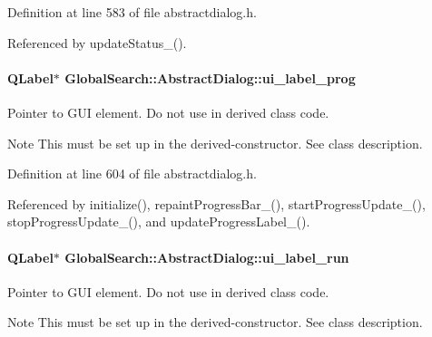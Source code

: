 Definition at line 583 of file abstractdialog.\+h.



Referenced by update\+Status\+\_\+().

\hypertarget{classGlobalSearch_1_1AbstractDialog_a21e1395aea6ac29a9c97b7ec2f54eb14}{}
\paragraph[{ui\+\_\+label\+\_\+prog}]{\setlength{\rightskip}{0pt plus 5cm}Q\+Label$\ast$ Global\+Search\+::\+Abstract\+Dialog\+::ui\+\_\+label\+\_\+prog\hspace{0.3cm}{\ttfamily [protected]}}\label{classGlobalSearch_1_1AbstractDialog_a21e1395aea6ac29a9c97b7ec2f54eb14}
Pointer to G\+U\+I element. Do not use in derived class code. \begin{DoxyNote}{Note}
This must be set up in the derived-\/constructor. See class description. 
\end{DoxyNote}


Definition at line 604 of file abstractdialog.\+h.



Referenced by initialize(), repaint\+Progress\+Bar\+\_\+(), start\+Progress\+Update\+\_\+(), stop\+Progress\+Update\+\_\+(), and update\+Progress\+Label\+\_\+().

\hypertarget{classGlobalSearch_1_1AbstractDialog_af65c818f2bf846bcd76aa0e755e13453}{}
\paragraph[{ui\+\_\+label\+\_\+run}]{\setlength{\rightskip}{0pt plus 5cm}Q\+Label$\ast$ Global\+Search\+::\+Abstract\+Dialog\+::ui\+\_\+label\+\_\+run\hspace{0.3cm}{\ttfamily [protected]}}\label{classGlobalSearch_1_1AbstractDialog_af65c818f2bf846bcd76aa0e755e13453}
Pointer to G\+U\+I element. Do not use in derived class code. \begin{DoxyNote}{Note}
This must be set up in the derived-\/constructor. See class description. 
\end{DoxyNote}


